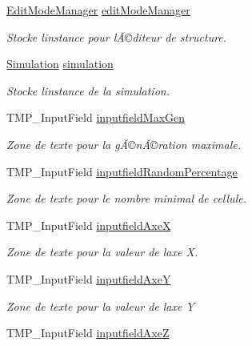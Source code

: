 \begin{DoxyCompactItemize}
\item 
\mbox{\hyperlink{class_edit_mode_manager}{Edit\+Mode\+Manager}} \mbox{\hyperlink{class_parameters_ac7a257a7373d1889a8bdf4eca25e6574}{edit\+Mode\+Manager}}
\begin{DoxyCompactList}\small\item\em Stocke l\textquotesingle{}instance pour l\textquotesingle{}Ã©diteur de structure. \end{DoxyCompactList}\item 
\mbox{\hyperlink{class_simulation}{Simulation}} \mbox{\hyperlink{class_parameters_ae0b748fde33ea353527d677ad10598dc}{simulation}}
\begin{DoxyCompactList}\small\item\em Stocke l\textquotesingle{}instance de la simulation. \end{DoxyCompactList}\item 
T\+M\+P\+\_\+\+Input\+Field \mbox{\hyperlink{class_parameters_a5dfd90d9127f6ac54d0fc72ce5aeaf89}{inputfield\+Max\+Gen}}
\begin{DoxyCompactList}\small\item\em Zone de texte pour la gÃ©nÃ©ration maximale. \end{DoxyCompactList}\item 
T\+M\+P\+\_\+\+Input\+Field \mbox{\hyperlink{class_parameters_a25554c9b16cf4851153f94ded0c9506a}{inputfield\+Random\+Percentage}}
\begin{DoxyCompactList}\small\item\em Zone de texte pour le nombre minimal de cellule. \end{DoxyCompactList}\item 
T\+M\+P\+\_\+\+Input\+Field \mbox{\hyperlink{class_parameters_a144f3907a5a97b677777c361e1732d87}{inputfield\+AxeX}}
\begin{DoxyCompactList}\small\item\em Zone de texte pour la valeur de l\textquotesingle{}axe X. \end{DoxyCompactList}\item 
T\+M\+P\+\_\+\+Input\+Field \mbox{\hyperlink{class_parameters_a7a8f81335eea4caef79b5b2aee17e473}{inputfield\+AxeY}}
\begin{DoxyCompactList}\small\item\em Zone de texte pour la valeur de l\textquotesingle{}axe Y \end{DoxyCompactList}\item 
T\+M\+P\+\_\+\+Input\+Field \mbox{\hyperlink{class_parameters_aa791b4cf0b210915f89c2d302a4e7512}{inputfield\+AxeZ}}

\end{DoxyCompactItemize}
